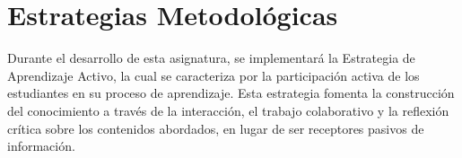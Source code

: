\section{Estrategias Metodológicas}

Durante el desarrollo de esta asignatura, se implementará la Estrategia de Aprendizaje Activo, la cual se caracteriza por la participación activa de los estudiantes en su proceso de aprendizaje. Esta estrategia fomenta la construcción del conocimiento a través de la interacción, el trabajo colaborativo y la reflexión crítica sobre los contenidos abordados, en lugar de ser receptores pasivos de información.